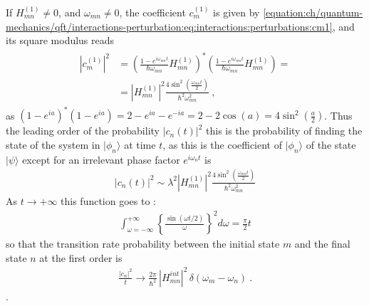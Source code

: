 \documentclass[letterpaper,10pt,english]{jupyterBook}
\begin{document}
\sphinxAtStartPar
If \(H^{(1)}_{mn} \ne 0\), and \(\omega_{mn} \ne 0\), the coefficient \(c_{m}^{(1)}\) is given by \eqref{equation:ch/quantum-mechanics/qft/interactions-perturbation:eq:interactions:perturbations:cm1}, and its square modulus reads
\begin{equation*}
\begin{split}\begin{aligned}
  |c_m^{(1)}|^2 
  & = \left( \frac{1 - e^{i \omega_{mn} t}}{\hbar\omega_{mn}} H^{(1)}_{mn} \right)^* \left( \frac{1 - e^{i \omega_{mn} t}}{\hbar\omega_{mn}} H^{(1)}_{mn} \right) = \\
  & = \left| H_{mn}^{(1)} \right|^2 \frac{4 \sin^2 \left( \frac{\omega_{mn} t}{2} \right)}{\hbar^2 \omega_{mn}^2} \ ,
\end{aligned}\end{split}
\end{equation*}
\sphinxAtStartPar
as \((1 - e^{i a})^* (1- e^{i a}) = 2 - e^{ia} - e^{-ia} = 2 - 2 \cos( a ) = 4 \sin^2 \left( \tfrac{a}{2} \right)\). Thus the leading order of the probability \(| c_n(t)|^2\) \sphinxhyphen{} this is the probability of finding the state of the system in \(| \phi_n \rangle\) at time \(t\), as this is the coefficient of \(| \phi_n \rangle\) of the state \(| \psi \rangle\) except for an irrelevant phase factor \(e^{i \omega_{n} t}\) \sphinxhyphen{} is
\begin{equation*}
\begin{split}
|c_n(t)|^2\sim\lambda^2|H^{(1)}_{mn}|^2\frac{4\sin^2\!\left(\frac{\omega_{mn}t}{2}\right)}{\hbar^2\omega_{mn}^2}
\end{split}
\end{equation*}
\sphinxAtStartPar
As \(t\to+\infty\) this function goes to :
\begin{equation*}
\begin{split}
\int_{\omega=-\infty}^{+\infty}\left\{\frac{\sin(\omega t/2)}{\omega}\right\}^2d\omega=\frac\pi2t
\end{split}
\end{equation*}
\sphinxAtStartPar
so that the transition rate probability between the initial state \(m\) and the final state \(n\) at the first order is
\begin{equation*}
\begin{split}
 \frac{|c_n|^2}{t} \longrightarrow \frac{2\pi}{\hbar^2} \,|H^{int}_{mn}|^2\,\delta(\omega_m-\omega_n) \ .
\end{split}
\end{equation*}
\sphinxAtStartPar
{}  .
\end{document}
